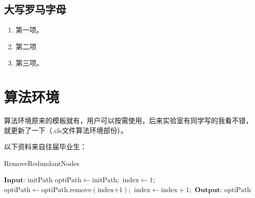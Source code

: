 \subsection{大写罗马字母}
\begin{enumerate}[topsep = 0 pt, itemsep= 0 pt, parsep=0pt, partopsep=0pt, leftmargin=0pt, itemindent=44pt, labelsep=6pt, listparindent=24pt, label=(\Roman*)]
	\item 第一项。

	\item 第二项
	
	\item 第三项。
	
\end{enumerate}

\section{算法环境}
算法环境原来的模板就有，用户可以按需使用，后来实验室有同学写的我看不错，就更新了一下（.cls文件算法环境部份）。

以下资料来自往届毕业生：
\begin{algorithm}
    \caption{RemoveRedundantNodes}
    \label{冗余节点删除策略}
    \begin{algorithmic}[1]
        \setlength{\baselineskip}{16pt} %
            \State  $\textbf{Input:}\text{ initPath}$
            \State  $\text{optiPath} \gets \text{initPath};$
            \State  $\text{index} \gets 1;$
                    \State $\text{optiPath} \gets \text{optiPath.remove}(\text{index+1});$
                \Else
                    \State $\text{index} \gets \text{index} + 1;$
                \EndIf
            \EndWhile
            \State $\textbf{Output:}\text{ optiPath}$
\end{algorithmic}
\end{algorithm}


